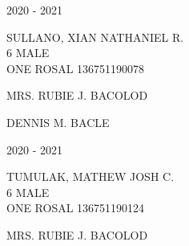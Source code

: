 \documentclass{article}
\begin{document}
{{\newpage
\begin{multicols}{2}
\phantom{u}
\columnbreak
\vspace*{-3mm}
\begin{center}
\phantom{school year:} \hspace*{6em} 2020 - 2021 
\end{center} 
\vspace{4mm} 
\phantom{Name:} \hspace*{5em} SULLANO, XIAN NATHANIEL R. \\[2.5mm] %
\phantom{Age} \hspace*{8em} 6  \phantom{Sex} \hspace*{12em} MALE \\[2.5mm] %
\phantom{Grade} \hspace*{3em} ONE \phantom{Section} \hspace*{4em} ROSAL \phantom{LRN} \hspace*{4em} 136751190078 \\
\vspace*{25mm}
\begin{flushright}
MRS. RUBIE J. BACOLOD \hspace*{-1.5em}
\end{flushright}  
\vspace*{1.5mm}
\hspace*{3em} DENNIS M. BACLE
\end{multicols} 
\newpage
\begin{multicols}{2}
\phantom{u}
\columnbreak
\vspace*{-3mm}
\begin{center}
\phantom{school year:} \hspace*{6em} 2020 - 2021 
\end{center} 
\vspace{4mm} 
\phantom{Name:} \hspace*{5em} TUMULAK, MATHEW JOSH C. \\[2.5mm] %
\phantom{Age} \hspace*{8em} 6  \phantom{Sex} \hspace*{12em} MALE \\[2.5mm] %
\phantom{Grade} \hspace*{3em} ONE \phantom{Section} \hspace*{4em} ROSAL \phantom{LRN} \hspace*{4em} 136751190124 \\
\vspace*{25mm}
\begin{flushright}
MRS. RUBIE J. BACOLOD \hspace*{-1.5em}

\end{flushright}
\end{multicols}}}
\end{document}
